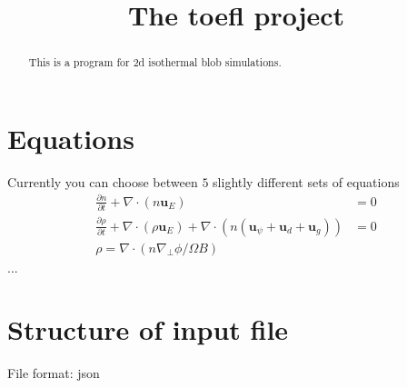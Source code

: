\documentclass{hitec}
\renewcommand{\vec}[1]{{\mathbf{#1}}}
\begin{document}
\title{The toefl project }
\maketitle
 
\begin{abstract}
This is a program for 2d isothermal blob simulations.
\end{abstract}

\section{Equations}
Currently you can choose between $5$ slightly different sets of equations
\begin{align}
 \frac{\partial n}{\partial t} + \nabla\cdot\left( n \vec u_E  \right) &= 0  \\
    \frac{\partial \rho}{\partial t} + \nabla\cdot\left( \rho\vec u_E \right) + \nabla \cdot\left( n(\vec u_\psi + \vec u_d + \vec u_g) \right) &= 0\\
\rho = \nabla\cdot( n\nabla_\perp \phi / \Omega B)
\end{align}
...
\section{Structure of input file}
File format: json
\end{document}
